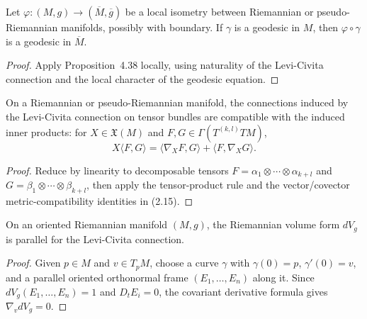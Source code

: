 \begin{corollary}
\label{cor:naturality-geodesics}


Let $\varphi:(M,g)\to(\overline M,\overline g)$ be a local isometry between
Riemannian or pseudo-Riemannian manifolds, possibly with boundary. If $\gamma$
is a geodesic in $M$, then $\varphi\circ\gamma$ is a geodesic in
$\overline M$.

\begin{proof}
\sketch Apply Proposition~4.38 locally, using naturality of the Levi-Civita
connection and the local character of the geodesic equation.
\end{proof}
\end{corollary}

\begin{proposition}
\label{prop:levi-civita-tensor-compatibility}

On a Riemannian or pseudo-Riemannian manifold, the connections induced by the
Levi-Civita connection on tensor bundles are compatible with the induced inner
products: for $X\in\mathfrak X(M)$ and
$F,G\in\Gamma(T^{(k,l)}TM)$,
\[
X\langle F,G\rangle
=\langle\nabla_XF,G\rangle+\langle F,\nabla_XG\rangle.
\]
\end{proposition}

\begin{proof}
\sketch Reduce by linearity to decomposable tensors
$F=\alpha_1\otimes\cdots\otimes\alpha_{k+l}$ and
$G=\beta_1\otimes\cdots\otimes\beta_{k+l}$, then apply the tensor-product
rule and the vector/covector metric-compatibility identities in (2.15).
\end{proof}

\begin{proposition}
\label{prop:riemannian-volume-form-parallel}


On an oriented Riemannian manifold $(M,g)$, the Riemannian volume form $dV_g$
is parallel for the Levi-Civita connection.

\begin{proof}
\sketch Given $p\in M$ and $v\in T_pM$, choose a curve $\gamma$ with
$\gamma(0)=p$, $\gamma'(0)=v$, and a parallel oriented orthonormal frame
$(E_1,\ldots,E_n)$ along it. Since
$dV_g(E_1,\ldots,E_n)=1$ and $D_tE_i=0$, the covariant derivative formula
gives $\nabla_vdV_g=0$.
\end{proof}
\end{proposition}

